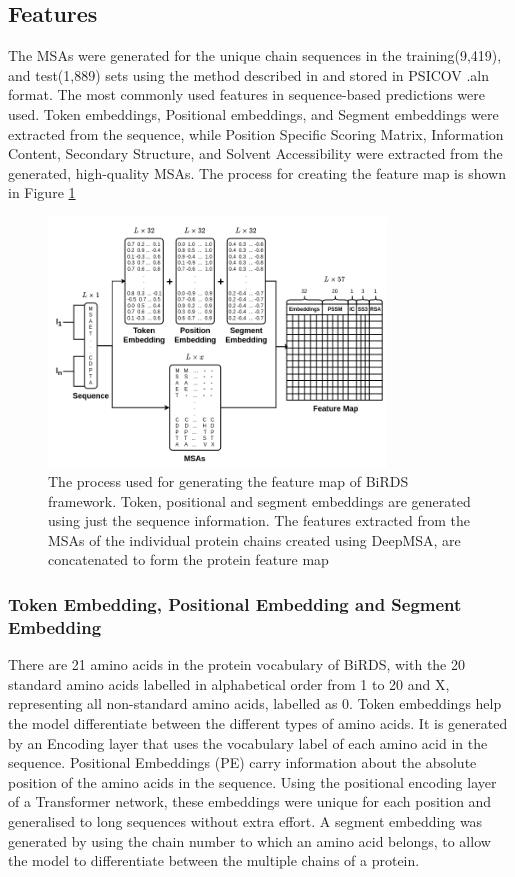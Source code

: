 \documentclass[journal=jcisd8,manuscript=article]{achemso}
\begin{document}
\subsection{Features}
\quad The MSAs were generated for the unique chain sequences in the training(9,419), and test(1,889) sets using the method described in  and stored in PSICOV\cite{jones2012psicov} .aln format. The most commonly used features in sequence-based predictions were used. Token embeddings, Positional embeddings, and Segment embeddings were extracted from the sequence, while Position Specific Scoring Matrix, Information Content, Secondary Structure, and Solvent Accessibility were extracted from the generated, high-quality MSAs. The process for creating the feature map is shown in Figure \ref{fig:feature_map}

\begin{figure}
    \centering
    \noindent\includegraphics[width=0.8\textwidth]{feature_map}
    \caption{\centering The process used for generating the feature map of BiRDS framework. Token, positional and segment embeddings are generated using just the sequence information. The features extracted from the MSAs of the individual protein chains created using DeepMSA, are concatenated to form the protein feature map}
    \label{fig:feature_map}
\end{figure}

\subsubsection{Token Embedding, Positional Embedding and Segment Embedding}
\quad There are 21 amino acids in the protein vocabulary of BiRDS, with the 20 standard amino acids labelled in alphabetical order from 1 to 20 and X, representing all non-standard amino acids, labelled as 0. Token embeddings help the model differentiate between the different types of amino acids. It is generated by an Encoding layer that uses the vocabulary label of each amino acid in the sequence. Positional Embeddings (PE) carry information about the absolute position of the amino acids in the sequence. Using the positional encoding layer of a Transformer network\cite{vaswani2017attention}, these embeddings were unique for each position and generalised to long sequences without extra effort. A segment embedding was generated by using the chain number to which an amino acid belongs, to allow the model to differentiate between the multiple chains of a protein.
\end{document}
